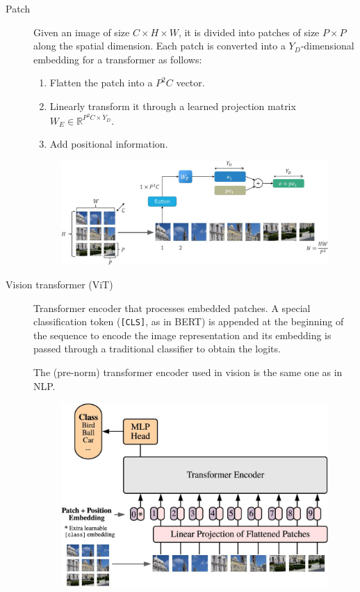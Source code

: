 \begin{description}
    \item[Patch] 
        Given an image of size $C \times H \times W$, it is divided into patches of size $P \times P$ along the spatial dimension. Each patch is converted into a $Y_D$-dimensional embedding for a transformer as follows:
        \begin{enumerate}
            \item Flatten the patch into a $P^2C$ vector.
            \item Linearly transform it through a learned projection matrix $W_E \in \mathbb{R}^{P^2C \times Y_D}$.
            \item Add positional information.
        \end{enumerate}

        \begin{figure}[H]
            \centering
            \includegraphics[width=0.8\linewidth]{./img/_vit_patch.jpg}
        \end{figure}

    \item[Vision transformer (ViT)] 
        Transformer encoder that processes embedded patches. A special classification token (\texttt{[CLS]}, as in BERT) is appended at the beginning of the sequence to encode the image representation and its embedding is passed through a traditional classifier to obtain the logits.

        \begin{remark}
            The (pre-norm) transformer encoder used in vision is the same one as in NLP.
        \end{remark}

        \begin{figure}[H]
            \centering
            \includegraphics[width=0.55\linewidth]{./img/_vision_transformer.jpg}
        \end{figure}


\end{description}
